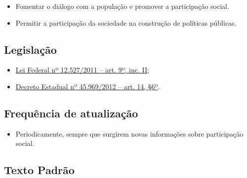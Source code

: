 \documentclass[]{book}
\providecommand{\tightlist}{%
  \setlength{\itemsep}{0pt}\setlength{\parskip}{0pt}}
\begin{document}
\begin{itemize}
\tightlist
\item
  Fomentar o diálogo com a população e promover a participação social.
\item
  Permitir a participação da sociedade na construção de políticas públicas.
\end{itemize}

\hypertarget{legislauxe7uxe3o-13}{%
\subsection{Legislação}\label{legislauxe7uxe3o-13}}

\begin{itemize}
\tightlist
\item
  \href{http://www.planalto.gov.br/ccivil_03/_ato2011-2014/2011/lei/l12527.htm\#art9}{Lei Federal nº 12.527/2011 -- art. 9º, inc. II};
\item
  \href{https://www.almg.gov.br/consulte/legislacao/completa/completa.html?tipo=DEC\&num=45969\&ano=2012}{Decreto Estadual nº 45.969/2012 -- art. 14, §6º}.
\end{itemize}

\hypertarget{frequuxeancia-de-atualizauxe7uxe3o-12}{%
\subsection{Frequência de atualização}\label{frequuxeancia-de-atualizauxe7uxe3o-12}}

\begin{itemize}
\tightlist
\item
  Periodicamente, sempre que surgirem novas informações sobre participação social.
\end{itemize}

\hypertarget{texto-padruxe3o-13}{%
\subsection{Texto Padrão}\label{texto-padruxe3o-13}}
\end{document}
